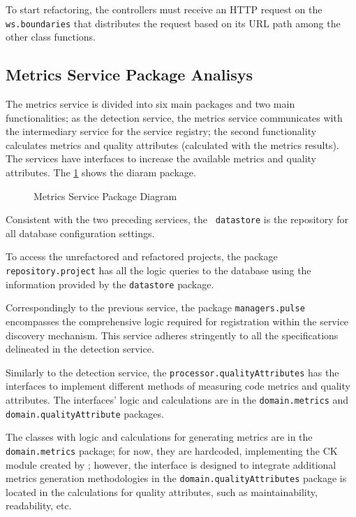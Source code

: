 To start refactoring, the controllers must receive an HTTP request on the \texttt{ws.boundaries} that distributes the request based on its URL path among the other class functions. 

\subsection{Metrics Service Package Analisys}
\label{sub-metrics-packages}

The metrics service is divided into six main packages and two main functionalities; as the detection service, the metrics service communicates with the intermediary service for the service registry; the second functionality calculates metrics and quality attributes (calculated with the metrics results). The services have interfaces to increase the available metrics and quality attributes. The \cref{fig-package-metrics} shows the diaram package.

\begin{figure}[ht!]
\SetCaptionWidth{\textwidth}
\caption{Metrics Service Package Diagram}
\label{fig-package-metrics}
\fontsize{9}{10}\selectfont

\end{figure}
\FloatBarrier

Consistent with the two preceding services, the \texttt{ datastore} is the repository for all database configuration settings.

To access the unrefactored and refactored projects, the package \texttt{repository.project} has all the logic queries to the database using the information provided by the \texttt{datastore} package.

Correspondingly to the previous service, the package \texttt{managers.pulse} encompasses the comprehensive logic required for registration within the service discovery mechanism. This service adheres stringently to all the specifications delineated in the detection service.

Similarly to the detection service, the \texttt{processor.qualityAttributes} has the interfaces to implement different methods of measuring code metrics and quality attributes. The interfaces' logic and calculations are in the \texttt{domain.metrics} and \texttt{domain.qualityAttribute} packages.

The classes with logic and calculations for generating metrics are in the \texttt{domain.metrics} package; for now, they are hardcoded, implementing the CK module created by \textcite{ck}; however, the interface is designed to integrate additional metrics generation methodologies in the \texttt{domain.qualityAttributes} package is located in the calculations for quality attributes, such as maintainability, readability, etc.


